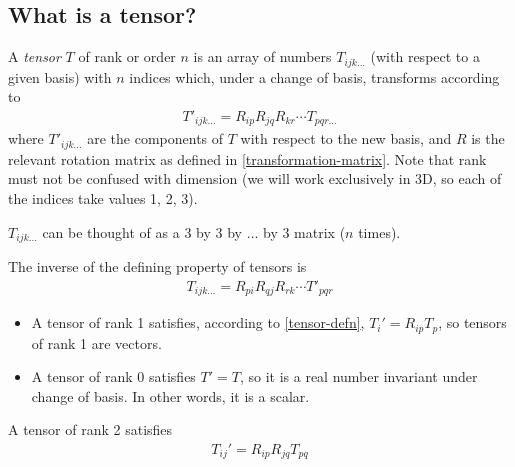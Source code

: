 \documentclass{../../template/note}
\begin{document}
    \subsection{What is a tensor?}

    \begin{definition}
        \label{tensor-defn}
        A \emph{tensor} \(T\) of rank or order \(n\) is an array of numbers \(T_{ijk\dots}\) (with respect to a given basis) with \(n\) indices which, under a change of basis, transforms according to
        \begin{align*}
            T'_{ijk\dots} = R_{ip} R_{jq} R_{kr} \cdots T_{pqr \dots}
        \end{align*}
        where \(T'_{ijk\dots}\) are the components of \(T\) with respect to the new basis, and \(R\) is the relevant rotation matrix as defined in \cref{transformation-matrix}. Note that rank must not be confused with dimension (we will work exclusively in 3D, so each of the indices take values 1, 2, 3).        
    \end{definition}
    
    \begin{remark*}
        \(T_{ijk \dots}\) can be thought of as a 3 by 3 by \(\dots\) by 3 matrix (\(n\) times).
    \end{remark*}
    
    \begin{lemma}
        The inverse of the defining property of tensors is
        \begin{align*}
            T_{ijk \dots} = R_{pi} R_{qj} R_{rk} \cdots T'_{pqr}
        \end{align*}
    \end{lemma}
    
    \begin{example*}
        \begin{itemize}
            \item A tensor of rank 1 satisfies, according to \cref{tensor-defn}, \(T_i' = R_{ip} T_p\), so tensors of rank 1 are vectors.
            \item A tensor of rank 0 satisfies \(T' = T\), so it is a real number invariant under change of basis. In other words, it is a scalar.
        \end{itemize}
    \end{example*}
    
    \begin{proposition}
        A tensor of rank 2 satisfies
        \begin{align*}
            T_{ij}' = R_{ip} R_{jq} T_{pq}
        \end{align*}
    \end{proposition}
    
\end{document}

